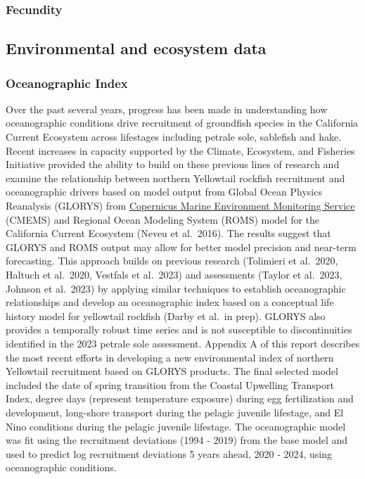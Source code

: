 \documentclass[
]{scrartcl}
\begin{document}
\subsubsection{Fecundity}\label{fecundity}

\subsection{Environmental and ecosystem
data}\label{environmental-and-ecosystem-data}

\subsubsection{Oceanographic Index}\label{oceanographic-index}

Over the past several years, progress has been made in understanding how
oceanographic conditions drive recruitment of groundfish species in the
California Current Ecosystem across lifestages including petrale sole,
sablefish and hake. Recent increases in capacity supported by the
Climate, Ecosystem, and Fisheries Initiative provided the ability to
build on these previous lines of research and examine the relationship
between northern Yellowtail rockfish recruitment and oceanographic
drivers based on model output from Global Ocean Physics Reanalysis
(GLORYS) from \href{https://marine.copernicus.eu/}{Copernicus Marine
Environment Monitoring Service} (CMEMS) and Regional Ocean Modeling
System (ROMS) model for the California Current Ecosystem (Neveu et
al.~2016). The results suggest that GLORYS and ROMS output may allow for
better model precision and near-term forecasting. This approach builds
on previous research (Tolimieri et al.~2020, Haltuch et al.~2020,
Vestfals et al.~2023) and assessments (Taylor et al.~2023, Johnson et
al.~2023) by applying similar techniques to establish oceanographic
relationships and develop an oceanographic index based on a conceptual
life history model for yellowtail rockfish (Darby et al.~in prep).
GLORYS also provides a temporally robust time series and is not
susceptible to discontinuities identified in the 2023 petrale sole
assessment. Appendix A of this report describes the most recent efforts
in developing a new environmental index of northern Yellowtail
recruitment based on GLORYS products. The final selected model included
the date of spring transition from the Coastal Upwelling Transport
Index, degree days (represent temperature exposure) during egg
fertilization and development, long-shore transport during the pelagic
juvenile lifestage, and El Nino conditions during the pelagic juvenile
lifestage. The oceanographic model was fit using the recruitment
deviations (1994 - 2019) from the base model and used to predict log
recruitment deviations 5 years ahead, 2020 - 2024, using oceanographic
conditions.
\end{document}
